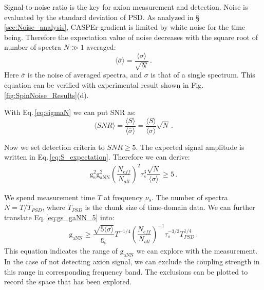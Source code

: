 Signal-to-noise ratio is the key for axion measurement and detection. Noise is evaluated by the standard deviation of PSD. As analyzed in \S\,\ref{sec:Noise_analysis}, CASPEr-gradient is limited by white noise for the time being. Therefore the expectation value of noise decreases with the square root of number of spectra $N \gg 1$ averaged:
\begin{equation}\label{eq:sigmaN}
    \langle \overline{\sigma} \rangle =\dfrac{\langle\sigma\rangle}{\sqrt{N}}\,.
\end{equation}
Here $\overline{\sigma}$ is the noise of averaged spectra, and $\sigma$ is that of a single spectrum. This equation can be verified with experimental result shown in Fig.\,\ref{fig:SpinNoise_Results}(d). 

With Eq.\,\eqref{eq:sigmaN} we can put SNR as:
\begin{equation}\label{eq:SNRandN}
    \langle SNR \rangle = \dfrac{\langle S \rangle}{ \langle \overline{\sigma} \rangle}= \dfrac{\langle S \rangle}{ \langle \sigma \rangle} \sqrt{N}\,.
\end{equation}

Now we set detection criteria to $SNR \geqslant 5$. The expected signal amplitude is written in Eq.\,\eqref{eq:S_expectation}. Therefore we can derive:
\begin{align}
    \mathrm{g_{s}^2}    \mathrm{g_{aNN}^2} \left(\dfrac{N_{eff}}{N_{all}}\right)^2 \tau_s^3
    \dfrac{\sqrt{N}}{\langle\sigma\rangle} \geqslant 5\,. \label{eq:gs_gaNN_5}
\end{align}

We spend measurement time $T$ at frequency $\nu_s$. The number of spectra $N = T/T_{PSD}$, where $T_{PSD}$ is the chunk size of time-domain data. 
We can further translate Eq.\,\eqref{eq:gs_gaNN_5} into:
\begin{align}
        \mathrm{g_{aNN}} \geqslant \dfrac{\sqrt{5 \langle\sigma\rangle}}{\mathrm{g_{s}}}   T^{-1/4}  \left(\dfrac{N_{eff}}{N_{all}}\right)^{-1} \tau_s^{-3/2}  T_{PSD}^{1/4}\,. \label{eq:exclusionthreshold_sce1_tausTPSD}
\end{align}
This equation indicates the range of $\mathrm{g_{aNN}}$ we can explore with the measurement. In the case of not detecting axion signal, we can exclude the coupling strength in this range in corresponding frequency band. The exclusions can be plotted to record the space that has been explored. 

